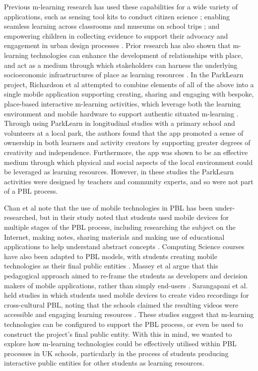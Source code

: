 \documentclass[,hyphens]{sigchi}
\begin{document}
Previous m-learning research has used these capabilities for a wide variety of applications, such as sensing tool kits to conduct citizen science \cite{Sharples2017}; enabling seamless learning across classrooms and museums on school trips \cite{Vavoula2009}; and empowering children in collecting evidence to support their advocacy and engagement in urban design processes \cite{Peacock2018}. Prior research has also shown that m-learning technologies can enhance the development of relationships with place, and act as a medium through which stakeholders can harness the underlying socioeconomic infrastructures of place as learning resources \cite{Richardson2017}. In the ParkLearn project, Richardson et al attempted to combine elements of all of the above into a single mobile application supporting creating, sharing and engaging with bespoke, place-based interactive m-learning activities, which leverage both the learning environment and mobile hardware to support authentic situated m-learning \cite{Richardson2018}. Through using ParkLearn in longitudinal studies with a primary school and volunteers at a local park, the authors found that the app promoted a sense of ownership in both learners and activity creators by supporting greater degrees of creativity and independence. Furthermore, the app was shown to be an effective medium through which physical and social aspects of the local environment could be leveraged as learning resources. However, in these studies the ParkLearn activities were designed by teachers and community experts, and so were not part of a PBL process.

Chan et al note that the use of mobile technologies in PBL has been under-researched, but in their study noted that students used mobile devices for multiple stages of the PBL process, including researching the subject on the Internet, making notes, sharing materials and making use of educational applications to help understand abstract concepts \cite{Chan2015}. Computing Science courses have also been adapted to PBL models, with students creating mobile technologies as their final public entities \cite{Massey2006, Rahman2018}. Massey et al argue that this pedagogical approach aimed to re-frame the students as developers and decision makers of mobile applications, rather than simply end-users \cite{Massey2006}. Sarangapani et al. held studies in which students used mobile devices to create video recordings for cross-cultural PBL, noting that the schools claimed the resulting videos were accessible and engaging learning resources \cite{Sarangapani2016}. These studies suggest that m-learning technologies can be configured to support the PBL process, or even be used to construct the project's final public entity. With this in mind, we wanted to explore how m-learning technologies could be effectively utilised within PBL processes in UK schools, particularly in the process of students producing interactive public entities for other students as learning resources.
\end{document}
